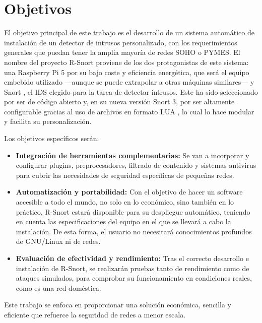 \documentclass[11pt,a4paper,twoside]{report}
\begin{document}
\chapter{Objetivos}
El objetivo principal de este trabajo es el desarrollo de un sistema automático de instalación de un detector de intrusos personalizado, con los requerimientos generales que puedan tener la amplia mayoría de redes SOHO o PYMES. El nombre del proyecto R-Snort proviene de los dos protagonistas de este sistema: una Raspberry Pi 5 \cite{rodriguez2018cluster} por su bajo coste y eficiencia energética, que será el equipo embebido utilizado —aunque se puede extrapolar a otras máquinas similares— y Snort \cite{roesch1999snort}, el IDS elegido para la tarea de detectar intrusos. Este ha sido seleccionado por ser de código abierto y, en su nueva versión Snort 3, por ser altamente configurable gracias al uso de archivos en formato LUA \cite{snort3_official}, lo cual lo hace modular y facilita su personalización.\newline

Los objetivos específicos serán:

\begin{itemize}
    \item \textbf{Integración de herramientas complementarias:} Se van a incorporar y configurar plugins, preprocesadores, filtrado de contenido y sistemas antivirus para cubrir las necesidades de seguridad específicas de pequeñas redes.
    
    \item \textbf{Automatización y portabilidad:} Con el objetivo de hacer un software accesible a todo el mundo, no solo en lo económico, sino también en lo práctico, R-Snort estará disponible para su despliegue automático, teniendo en cuenta las especificaciones del equipo en el que se llevará a cabo la instalación. De esta forma, el usuario no necesitará conocimientos profundos de GNU/Linux ni de redes.
    
    \item \textbf{Evaluación de efectividad y rendimiento:} Tras el correcto desarrollo e instalación de R-Snort, se realizarán pruebas tanto de rendimiento como de ataques simulados, para comprobar su funcionamiento en condiciones reales, como es una red doméstica.
    
\end{itemize}

Este trabajo se enfoca en proporcionar una solución económica, sencilla y eficiente que refuerce la seguridad de redes a menor escala.
\end{document}
